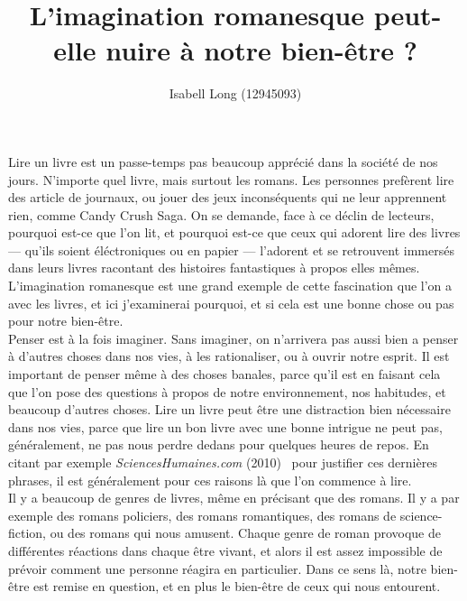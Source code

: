 \documentclass[12pt,a4paper]{article}
\begin{document}
\title{L'imagination romanesque peut-elle nuire à notre bien-être ?}
\author{Isabell Long (12945093)}
\maketitle

Lire un livre est un passe-temps pas beaucoup apprécié dans la société de nos
jours. N'importe quel livre, mais surtout les romans. Les personnes prefèrent
lire des article de journaux, ou jouer des jeux inconséquents qui ne leur
apprennent rien, comme Candy Crush Saga. On se demande, face à ce déclin de
lecteurs, pourquoi est-ce que l'on lit, et pourquoi est-ce que ceux qui adorent
lire des livres --- qu'ils soient éléctroniques ou en papier --- l'adorent et se
retrouvent immersés dans leurs livres racontant des histoires fantastiques à
propos elles mêmes. L'imagination romanesque est une grand exemple de cette
fascination que l'on a avec les livres, et ici j'examinerai pourquoi, et si cela
est une bonne chose ou pas pour notre bien-être.\\

Penser est à la fois imaginer. Sans imaginer, on n'arrivera pas aussi bien a
penser à d'autres choses dans nos vies, à les rationaliser, ou à ouvrir notre
esprit. Il est important de penser même à des choses banales, parce qu'il est en
faisant cela que l'on pose des questions à propos de notre environnement, nos
habitudes, et beaucoup d'autres choses. Lire un livre peut être une distraction
bien nécessaire dans nos vies, parce que lire un bon livre avec une bonne
intrigue ne peut pas, généralement, ne pas nous perdre dedans pour quelques
heures de repos. En citant par exemple \textit{SciencesHumaines.com}
(2010)~\nocite{shcom} pour justifier ces dernières phrases, il est généralement
pour ces raisons là que l'on commence à lire.\\

Il y a beaucoup de genres de livres, même en précisant que des romans. Il y a
par exemple des romans policiers, des romans romantiques, des romans de
science-fiction, ou des romans qui nous amusent. Chaque genre de roman provoque
de différentes réactions dans chaque être vivant, et alors il est assez
impossible de prévoir comment une personne réagira en particulier. Dans ce sens
là, notre bien-être est remise en question, et en plus le bien-être de ceux qui
nous entourent.\\
\end{document}
